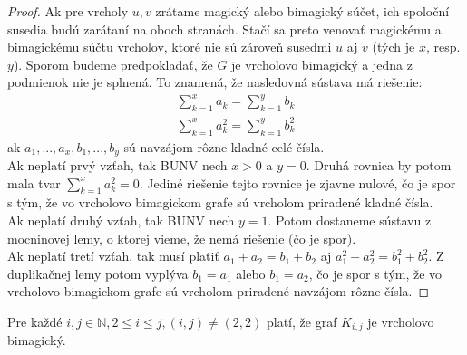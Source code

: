 \begin{proof} Ak pre vrcholy $u,v$ zrátame magický alebo bimagický súčet, ich spoloční susedia budú zarátaní na oboch stranách. Stačí sa preto venovať magickému a bimagickému súčtu vrcholov, ktoré nie sú zároveň susedmi $u$ aj $v$ (tých je $x$, resp. $y$). Sporom budeme predpokladať, že $G$ je vrcholovo bimagický a jedna z podmienok nie je splnená. To znamená, že nasledovná sústava má riešenie:
\begin{gather*}
\sum_{k=1}^{x} a_k = \sum_{k=1}^{y} b_k \\
\sum_{k=1}^{x} a^2_k = \sum_{k=1}^{y} b^2_k
\end{gather*}
ak $a_1, ... , a_x, b_1, ... , b_y$ sú navzájom rôzne kladné celé čísla. \\

Ak neplatí prvý vzťah, tak BUNV nech $x > 0$ a $y = 0$. Druhá rovnica by potom mala tvar $\sum_{k=1}^{x} a^2_k = 0$. Jediné riešenie tejto rovnice je zjavne nulové, čo je spor s tým, že vo vrcholovo bimagickom grafe sú vrcholom priradené kladné čísla.  \\

Ak neplatí druhý vzťah, tak BUNV nech $y = 1$. Potom dostaneme sústavu z mocninovej lemy, o ktorej vieme, že nemá riešenie (čo je spor). \\

Ak neplatí tretí vzťah, tak musí platiť $a_1 + a_2 = b_1 + b_2$ aj $a^2_1 + a^2_2 = b^2_1 + b^2_2$. Z duplikačnej lemy potom vyplýva $b_1 = a_1$ alebo $b_1 = a_2$,  čo je spor s tým, že vo vrcholovo bimagickom grafe sú vrcholom priradené navzájom rôzne čísla.
\end{proof}

\begin{theorem}
\label{vbgkij}
Pre každé  $i,j \in \mathbb{N}, 2 \leq i \leq j, (i, j) \neq (2, 2)$ platí, že graf $K_{i,j}$ je vrcholovo bimagický.
\end{theorem}

